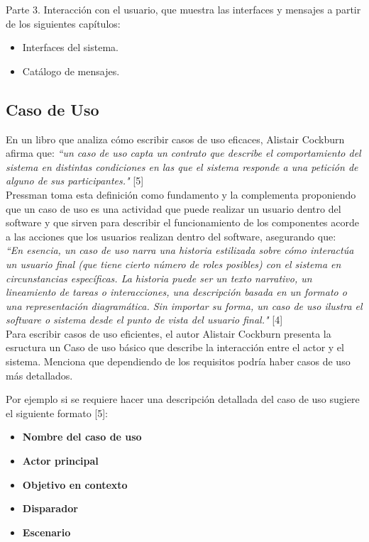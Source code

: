 \documentclass{article}
\begin{document}
\begin{multicols}{2}
	Parte 3. Interacción con el usuario, que muestra las interfaces y mensajes a partir de los siguientes capítulos:
	\begin{itemize}
		\item Interfaces del sistema.
		\item Catálogo de mensajes.
	\end{itemize}

	\subsection{Caso de Uso}
	
	En un libro que analiza cómo escribir casos de uso eficaces, Alistair Cockburn afirma que: \textit { “un caso de uso capta un contrato que describe el comportamiento del sistema en distintas condiciones en las que el sistema responde a una petición de alguno de sus participantes."} [5]\\
	
	Pressman toma esta definición como fundamento y la complementa proponiendo que un caso de uso es una actividad que puede realizar un usuario dentro del software y que sirven para describir el funcionamiento de los componentes acorde a las acciones que los usuarios realizan dentro del software, asegurando que:\\
	
	\textit {``En esencia, un caso de uso narra una historia estilizada sobre cómo interactúa un usuario final (que tiene cierto número de roles posibles) con el sistema en circunstancias específicas. La historia puede ser un texto narrativo, un lineamiento de tareas o interacciones, una descripción basada en un formato o una representación diagramática. Sin importar su forma, un caso de uso ilustra el software o sistema desde el punto de vista del usuario final."} [4]\\
	
	Para escribir casos de uso eficientes, el autor Alistair Cockburn presenta la esructura un Caso de uso básico que describe la interacción entre el actor y el sistema. Menciona que dependiendo de los requisitos podría haber casos de uso más detallados. 
	
	Por ejemplo si se requiere hacer una descripción detallada del caso de uso sugiere el siguiente formato [5]: 
	
	\begin{itemize}
		\item \textbf{Nombre del caso de uso}
		\item \textbf{Actor principal}
		\item \textbf{Objetivo en contexto} 
		\item \textbf{Disparador} 
		\item \textbf{Escenario} 
	\end{itemize}
	

\end{multicols}
\end{document}
